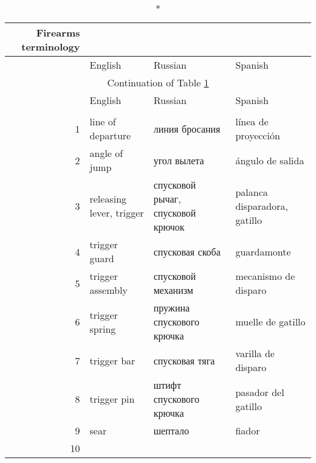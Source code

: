 
\usepackage{longtable}
\newcommand{\vv}{\\}



\begin{longtable}[c]{|r|p{1.8in}|p{1.8in}|p{1.8in}|}
 \caption*{Firearms terminology\label{long}}\\

 \hline
 & English & Russian & Spanish\\
 \hline
 \endfirsthead

 \hline
 \multicolumn{4}{|c|}{Continuation of Table \ref{long}}\\
 \hline
 & English & Russian & Spanish\\
 \hline
 \endhead

 \hline
 \endfoot

 \hline
 \multicolumn{4}{|c|}{End of Table}\\
 \hline\hline
 \endlastfoot

 1 & line of departure & линия бросания & línea de proyección\vv
 2 & angle of jump & угол вылета & ángulo de salida\vv
 3 & releasing lever, trigger & спусковой рычаг, спусковой крючок & palanca disparadora, gatillo\vv
 4 & trigger guard & спусковая скоба & guardamonte\vv
 5 & trigger assembly & спусковой механизм & mecanismo de disparo\vv
 6 & trigger spring & пружина спускового крючка & muelle de gatillo\vv
 7 & trigger bar & спусковая тяга & varilla de disparo\vv
 8 & trigger pin & штифт спускового крючка & pasador del gatillo\vv
 9 & sear & шептало & fiador\vv
 10 & & & \vv

\end{longtable}

